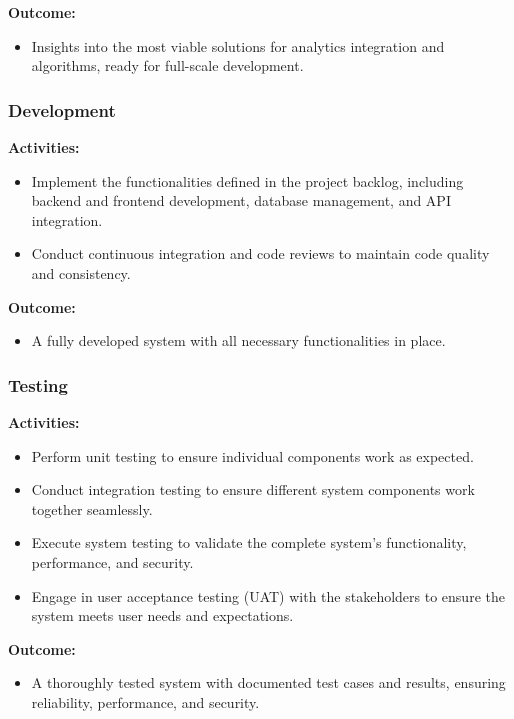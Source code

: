 \documentclass[12pt,a4paper]{article}
\begin{document}
\noindent \textbf{Outcome:}
\begin{itemize}
    \item Insights into the most viable solutions for analytics integration and algorithms, ready for full-scale development.
\end{itemize}

\subsubsection{Development}

\noindent \textbf{Activities:}
\begin{itemize}
    \item Implement the functionalities defined in the project backlog, including backend and frontend development, database management, and API integration.
    \item Conduct continuous integration and code reviews to maintain code quality and consistency.
\end{itemize}

\noindent \textbf{Outcome:}
\begin{itemize}
    \item A fully developed system with all necessary functionalities in place.
\end{itemize}

\subsubsection{Testing}

\noindent \textbf{Activities:}
\begin{itemize}
    \item Perform unit testing to ensure individual components work as expected.
    \item Conduct integration testing to ensure different system components work together seamlessly.
    \item Execute system testing to validate the complete system's functionality, performance, and security.
    \item Engage in user acceptance testing (UAT) with the stakeholders to ensure the system meets user needs and expectations.
\end{itemize}

\noindent \textbf{Outcome:}
\begin{itemize}
    \item A thoroughly tested system with documented test cases and results, ensuring reliability, performance, and security.
\end{itemize}
\end{document}
